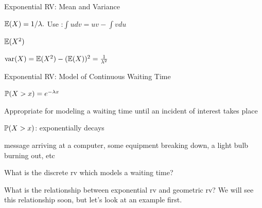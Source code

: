 \begin{frame}{Exponential RV: Mean and Variance}

\plitemsep 0.1in
\bci
\item $\mathbb{E}( X ) = 1/\lambda.$ Use :$\displaystyle \int u dv = uv - \int v du$
\item $\mathbb{E}( X^2 )$
\item $\text{var}( X ) = \mathbb{E}( X^2 ) - (\mathbb{E}( X ))^2 = \frac{1}{\lambda^2}$
\eci

\end{frame}

\begin{frame}{Exponential RV: Model of Continuous Waiting Time}

\plitemsep 0.15in
\bci
\item<1-> $\mathbb{P}( X > x ) = e^{-\lambda x}$
\item<2-> Appropriate for modeling a waiting time until an incident of interest takes place
\bci
\item $\mathbb{P}( X > x )$: exponentially decays
\item message arriving at a computer, some equipment breaking down, a light bulb burning out, etc
\eci

\item<3->  What is the discrete rv which models a waiting time?  

\item<4-> What is the relationship between exponential rv and geometric rv? We will see this relationship soon, but let's look at an example first.

\eci

\end{frame}

